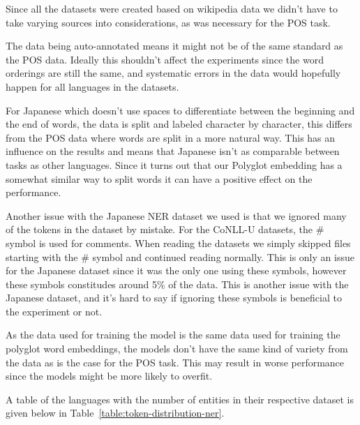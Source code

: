 Since all the datasets were created based on wikipedia data we didn't have to
take varying sources into considerations, as was necessary for the POS task.

The data being auto-annotated means it might not be of the same standard as the
POS data. Ideally this shouldn't affect the experiments since the word orderings
are still the same, and systematic errors in the data would hopefully happen for
all languages in the datasets.

For Japanese which doesn't use spaces to differentiate between the beginning and
the end of words, the data is split and labeled character by character, this
differs from the POS data where words are split in a more natural way. This has
an influence on the results and means that Japanese isn't as comparable between
tasks as other languages. Since it turns out that our Polyglot embedding has a
somewhat similar way to split words it can have a positive effect on the
performance.

Another issue with the Japanese NER dataset we used is that we ignored many of
the tokens in the dataset by mistake. For the CoNLL-U datasets, the \# symbol is
used for comments. When reading the datasets we simply skipped files starting
with the \# symbol and continued reading normally. This is only an issue for the
Japanese dataset since it was the only one using these symbols, however these
symbols constitudes around 5\% of the data. This is another issue with the
Japanese dataset, and it's hard to say if ignoring these symbols is beneficial
to the experiment or not.

As the data used for training the model is the same data used for training the
polyglot word embeddings, the models don't have the same kind of variety from
the data as is the case for the POS task. This may result in worse performance
since the models might be more likely to overfit.

A table of the languages with the number of entities in their respective dataset
is given below in Table~\ref{table:token-distribution-ner}. 

